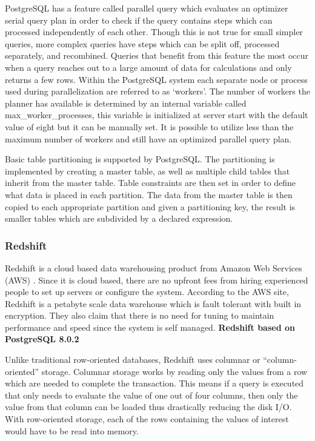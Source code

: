 \documentclass[draftclsnofoot, onecolumn, compsoc, 10pt]{IEEEtran}
\begin{document}
PostgreSQL has a feature called parallel query which evaluates an optimizer serial query plan in order to check if the query contains steps which can processed independently of each other.
Though this is not true for small simpler queries, more complex queries have steps which can be split off, processed separately, and recombined.
Queries that benefit from this feature the most occur when a query reaches out to a large amount of data for calculations and only returns a few rows.
Within the PostgreSQL system each separate node or process used during parallelization are referred to as ‘workers’.
The number of workers the planner has available is determined by an internal variable called max\_worker\_processes, this variable is initialized at server start with the default value of eight but it can be manually set.
It is possible to utilize less than the maximum number of workers and still have an optimized parallel query plan.

Basic table partitioning is supported by PostgreSQL.
The partitioning is implemented by creating a master table, as well as multiple child tables that inherit from the master table.
Table constraints are then set in order to define what data is placed in each partition.
The data from the master table is then copied to each appropriate partition and given a partitioning key, the result is smaller tables which are subdivided by a declared expression.

\subsubsection{Redshift}
Redshift is a cloud based data warehousing product from Amazon Web Services (AWS)
. Since it is cloud based, there are no upfront fees from hiring experienced people to set up servers or configure the system.
According to the  AWS site, Redshift is a petabyte scale data warehouse which is fault tolerant with built in encryption.
They also claim that there is no need for tuning to maintain performance and speed since the system is self managed. \textbf{Redshift based on PostgreSQL 8.0.2}


Unlike traditional row-oriented databases, Redshift uses columnar or “column-oriented” storage.
Columnar storage works by reading only the values from a row which are needed to complete the transaction.
This means if a query is executed that only needs to evaluate the value of one out of four columns, then only the value from that column can be loaded thus drastically reducing the disk I/O.
With row-oriented storage, each of the rows containing the values of interest would have to be read into memory.
\end{document}
